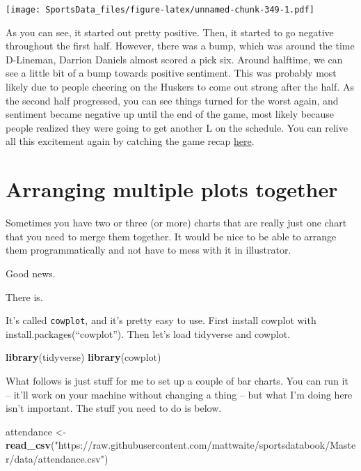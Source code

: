 \documentclass[
]{book}
\newenvironment{Shaded}{\begin{snugshade}}{\end{snugshade}}
\newcommand{\KeywordTok}[1]{\textcolor[rgb]{0.13,0.29,0.53}{\textbf{#1}}}
\newcommand{\NormalTok}[1]{#1}
\newcommand{\StringTok}[1]{\textcolor[rgb]{0.31,0.60,0.02}{#1}}
\begin{document}
\texttt{[image: SportsData\_files/figure-latex/unnamed-chunk-349-1.pdf]}

As you can see, it started out pretty positive. Then, it started to go negative throughout the first half. However, there was a bump, which was around the time D-Lineman, Darrion Daniels almost scored a pick six. Around halftime, we can see a little bit of a bump towards positive sentiment. This was probably most likely due to people cheering on the Huskers to come out strong after the half. As the second half progressed, you can see things turned for the worst again, and sentiment became negative up until the end of the game, most likely because people realized they were going to get another L on the schedule. You can relive all this excitement again by catching the game recap \href{https://www.youtube.com/watch?v=m0hKH6Zb0vY\&feature=onebox}{here}.

\hypertarget{arranging-multiple-plots-together}{%
\chapter{Arranging multiple plots together}\label{arranging-multiple-plots-together}}

Sometimes you have two or three (or more) charts that are really just one chart that you need to merge them together. It would be nice to be able to arrange them programmatically and not have to mess with it in illustrator.

Good news.

There is.

It's called \texttt{cowplot}, and it's pretty easy to use. First install cowplot with install.packages(``cowplot''). Then let's load tidyverse and cowplot.

\begin{Shaded}
\begin{Highlighting}[]
\KeywordTok{library}\NormalTok{(tidyverse)}
\KeywordTok{library}\NormalTok{(cowplot)}
\end{Highlighting}
\end{Shaded}

What follows is just stuff for me to set up a couple of bar charts. You can run it -- it'll work on your machine without changing a thing -- but what I'm doing here isn't important. The stuff you need to do is below.

\begin{Shaded}
\begin{Highlighting}[]
\NormalTok{attendance <-}\StringTok{ }\KeywordTok{read_csv}\NormalTok{(}\StringTok{"https://raw.githubusercontent.com/mattwaite/sportsdatabook/Master/data/attendance.csv"}\NormalTok{)}
\end{Highlighting}
\end{Shaded}
\end{document}
